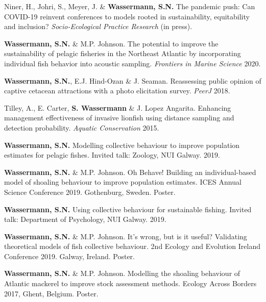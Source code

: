 \documentclass[a4paper]{deedy-resume} %
\begin{document}
\begin{flushleft}
\begin{tightitemize}
\item Niner, H., Johri, S., Meyer, J. \& \textbf{Wassermann, S.N.} The pandemic push: Can COVID-19 reinvent conferences to models rooted in sustainability, equitability and inclusion? \textit{Socio-Ecological  Practice Research} (in press).
\item \textbf{Wassermann, S.N.} \& M.P. Johnson. The potential to improve the sustainability of pelagic fisheries in the Northeast Atlantic by incorporating individual fish behavior into acoustic sampling. \textit{Frontiers in Marine Science} 2020. 
\item \textbf{Wassermann, S.N.}, E.J. Hind-Ozan \& J. Seaman. 
Reassessing public opinion of captive cetacean attractions with a photo elicitation survey. \textit{PeerJ} 2018.
\item Tilley, A., E. Carter, \textbf{S. Wassermann} \& J. Lopez Angarita. Enhancing management effectiveness of invasive lionfish using distance sampling and detection probability. \textit{Aquatic Conservation} 2015.
\end{tightitemize}

\sectionspace

\begin{tightitemize}
\item \textbf{Wassermann, S.N.} Modelling collective behaviour to improve population estimates for pelagic fishes. Invited talk: Zoology, NUI Galway. 2019.
\item \textbf{Wassermann, S.N.} \& M.P. Johnson. Oh Behave! Building an individual-based model of shoaling behaviour to improve population estimates. ICES Annual Science Conference 2019. Gothenburg, Sweden. Poster.
\item \textbf{Wassermann, S.N.} Using collective behaviour for sustainable fishing. Invited talk: Department of Psychology, NUI Galway. 2019.
\item \textbf{Wassermann, S.N.} \& M.P. Johnson. It's wrong, but is it useful? Validating theoretical models of fish collective behaviour. 2nd Ecology and Evolution Ireland Conference 2019. Galway, Ireland. Poster.
\item \textbf{Wassermann, S.N.} \& M.P. Johnson. Modelling the shoaling behaviour of Atlantic mackerel to improve stock assessment methods. Ecology Across Borders 2017, Ghent, Belgium. Poster.
\end{tightitemize}

\end{flushleft}
\end{document}
